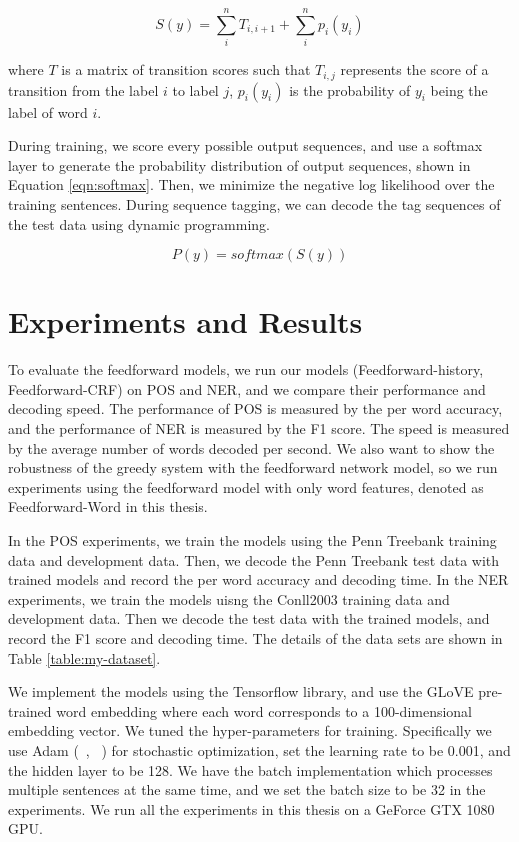 \documentclass{sfuthesis}
\begin{document}
\begin{equation}
S\left( y\right)=\sum _{i}^{n}T_{i,i+1}+\sum _{i}^{n}p_{i}\left(y_{i}\right)
\end{equation}

where $T$ is a matrix of transition scores such that $T_{i,j}$ represents the score of a transition from the label $i$ to label $j$, $p_{i}\left(y_{i}\right)$ is the probability of $y_{i}$ being the label of word $i$.

During training, we score every possible output sequences, and use a softmax layer to generate the probability distribution of output sequences, shown in Equation \ref{eqn:softmax}. Then, we minimize the negative log likelihood over the training sentences. During sequence tagging, we can decode the tag sequences of the test data using dynamic programming.

\begin{equation}\label{eqn:softmax}
P\left( y\right) = softmax(S\left( y\right))
\end{equation}


\section{Experiments and Results}
To evaluate the feedforward models, we run our models (Feedforward-history, Feedforward-CRF) on POS and NER, and we compare their performance and decoding speed. The performance of POS is measured by the per word accuracy, and the performance of NER is measured by the F1 score. The speed is measured by the average number of words decoded per second. We also want to show the robustness of the greedy system with the feedforward network model, so we run experiments using the feedforward model with only word features, denoted as Feedforward-Word in this thesis. 

In the POS experiments, we train the models using the Penn Treebank training data and development data. Then, we decode the Penn Treebank test data with trained models and record the per word accuracy and decoding time. In the NER experiments, we train the models uisng the Conll2003 training data and development data. Then we decode the test data with the trained models, and record the F1 score and decoding time. The details of the data sets are shown in Table \ref{table:my-dataset}.

 
We implement the models using the Tensorflow library, and use the GLoVE pre-trained word embedding where each word corresponds to a 100-dimensional embedding vector. We tuned the hyper-parameters for training. Specifically we use Adam (~\citeauthor{kingma2014adam}, ~\citeyear{kingma2014adam}) for stochastic optimization, set the learning rate to be 0.001, and the hidden layer to be 128. We have the batch implementation which processes multiple sentences at the same time, and we set the batch size to be 32 in the experiments. We run all the experiments in this thesis on a GeForce GTX 1080 GPU. 
\end{document}
